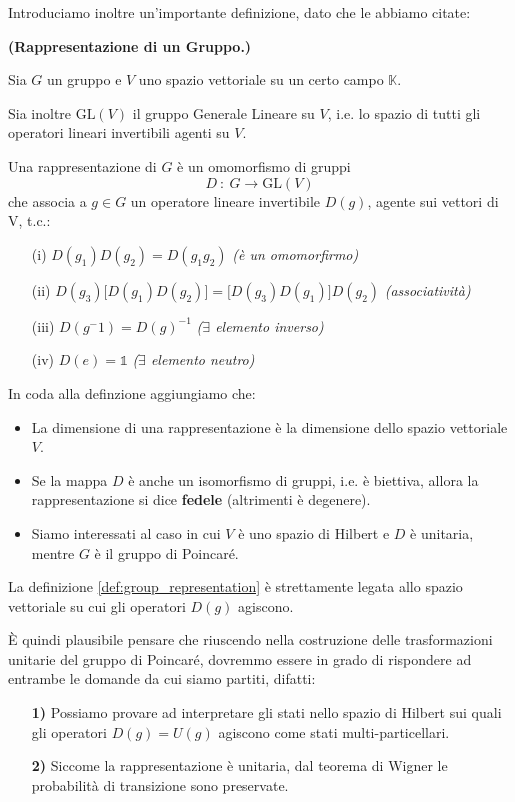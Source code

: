 \documentclass[../main.tex]{subfiles}
\begin{document}
Introduciamo inoltre un'importante definizione, dato che le abbiamo citate:
\begin{definition}
    \textbf{(Rappresentazione di un Gruppo.)}

    Sia \(G\) un gruppo e $V$ uno spazio vettoriale su un certo campo $\mathbb K$.

    Sia inoltre $\text{GL}(V)$ il gruppo Generale Lineare su $V$, i.e. lo spazio di tutti gli operatori lineari invertibili agenti su $V$.

    Una rappresentazione di $G$ è un omomorfismo di gruppi
    \[
    \boxed{D ~:~ G \rightarrow \text{GL}(V)}
    \]
    che associa a \(g\in G\) un operatore lineare invertibile \(D(g)\), agente sui vettori di V, t.c.:
    \begin{enumerate}
        \item[(i)] \(D(g_1)D(g_2)=D(g_1g_2)\) \quad \textit{(è un omomorfirmo)}
        \item[(ii)] \(D(g_3)\big[D(g_1)D(g_2)\big]=\big[D(g_3)D(g_1)\big]D(g_2)\) \quad \textit{(associatività)}
        \item[(iii)] \(D(g^-1)=D(g)^{-1}\) \quad \textit{($\exists$ elemento inverso)}
        \item[(iv)] \(D(e)=\mathbb 1\) \quad \textit{($\exists$ elemento neutro)}
    \end{enumerate}
    \label{def:group_representation}
\end{definition}

In coda alla definzione aggiungiamo che:
\begin{itemize}
    \item La dimensione di una rappresentazione è la dimensione dello spazio vettoriale $V$.
    \item Se la mappa $D$ è anche un isomorfismo di gruppi, i.e. è biettiva, allora la rappresentazione si dice \textbf{fedele} (altrimenti è degenere).
    \item Siamo interessati al caso in cui $V$ è uno spazio di Hilbert e $D$ è unitaria, mentre $G$ è il gruppo di Poincaré.
\end{itemize}

\begin{nota}
    La definizione \ref{def:group_representation} è strettamente legata allo spazio vettoriale su cui gli operatori $D(g)$ agiscono. 

    È quindi plausibile pensare che riuscendo nella costruzione delle trasformazioni unitarie del gruppo di Poincaré, dovremmo essere in grado di rispondere ad entrambe le domande da cui siamo partiti, difatti:
    \begin{enumerate}
        \item[\textbf{1)}] Possiamo provare ad interpretare gli stati nello spazio di Hilbert sui quali gli operatori $D(g)=U(g)$ agiscono come stati multi-particellari.
        \item[\textbf{2)}] Siccome la rappresentazione è unitaria, dal teorema di Wigner le probabilità di transizione sono preservate.
    \end{enumerate}
\end{nota}
\end{document}
